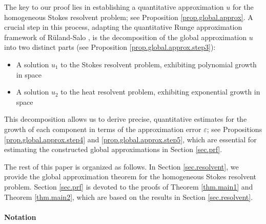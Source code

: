 \documentclass[11pt,a4paper]{article}
\numberwithin{equation}{section}
\newcommand{\eps}{\varepsilon}
\begin{document}
The key to our proof lies in establishing a quantitative approximation $u$ for the homogeneous Stokes resolvent problem; see Proposition \ref{prop.global.approx}. A crucial step in this process, adapting the quantitative Runge approximation framework of R\"{u}land-Salo \cite{RulSal2019}, is the decomposition of the global approximation $u$ into two distinct parts (see Proposition \ref{prop.global.approx.step3}):
\begin{itemize}
\item
A solution $u_1$ to the Stokes resolvent problem, exhibiting polynomial growth in space


\item
A solution $u_2$ to the heat resolvent problem, exhibiting exponential growth in space
\end{itemize}
This decomposition allows us to derive precise, quantitative estimates for the growth of each component in terms of the approximation error $\eps$; see Propositions \ref{prop.global.approx.step4} and \ref{prop.global.approx.step5}, which are essential for estimating the constructed global approximations in Section \ref{sec.prf}. 


The rest of this paper is organized as follows. In Section \ref{sec.resolvent}, we provide the global approximation theorem for the homogeneous Stokes resolvent problem. Section \ref{sec.prf} is devoted to the proofs of Theorem \ref{thm.main1} and Theorem \ref{thm.main2}, which are based on the results in Section \ref{sec.resolvent}. 


    \paragraph{Notation} 
\end{document}
